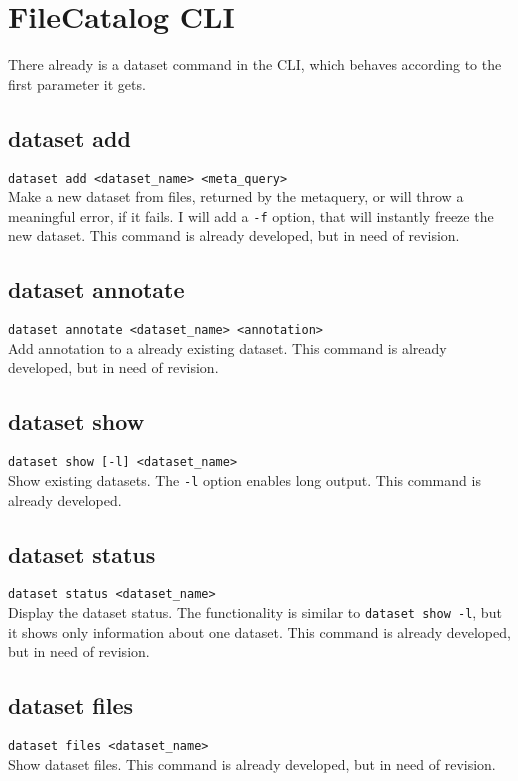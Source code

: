 \documentclass{scrreprt}
\begin{document}
\section{FileCatalog CLI}
There already is a dataset command in the CLI, which behaves according to the first parameter it gets. 

\subsection{dataset add}
\texttt{dataset add <dataset_name> <meta_query>} \\
Make a new dataset from files, returned by the metaquery, or will throw a meaningful error, if it fails.  I will add a \texttt{-f} option, that will instantly freeze the new dataset. This command is already developed, but in need of revision.

\subsection{dataset annotate} 
\texttt{dataset annotate <dataset_name> <annotation>}  \\
Add annotation to a already existing dataset. This command is already developed, but in need of revision.

\subsection{dataset show}
\texttt{dataset show [-l] <dataset_name>} \\
Show existing datasets. The \texttt{-l} option enables long output. This command is already developed.
               
\subsection{dataset status}
\texttt{dataset status <dataset_name>} \\
Display the dataset status. The functionality is similar to \texttt{dataset show -l}, but it shows only information about one dataset. This command is already developed, but in need of revision.

\subsection{dataset files}
\texttt{dataset files <dataset_name>} \\
Show dataset files. This command is already developed, but in need of revision.
\end{document}
